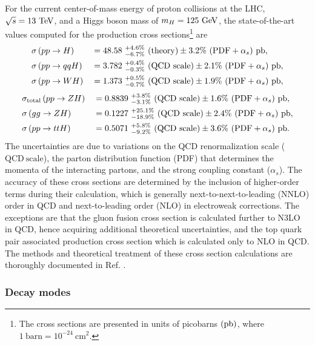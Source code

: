 For the current center-of-mass energy of proton collisions at the LHC, $\sqrt{s} = 13\ \mathrm{TeV}$, and a Higgs boson mass of $m_{H} = 125\ \mathrm{GeV}$, the state-of-the-art values computed for the production cross sections\footnote{The cross sections are presented in units of picobarns $(\mathrm{pb})$, where $1\ \mathrm{barn} = 10^{-24}\ \mathrm{cm}^{2}$.} are
\begin{alignat*}{2}
  &\sigma\left( pp \rightarrow H \right) &&= 48.58\ {}_{-6.7\%}^{+4.6\%} \ (\mathrm{theory}) \pm 3.2\%\ (\mathrm{PDF} + \alpha_{s})\ \mathrm{pb}, \\
  &\sigma\left( pp \rightarrow qqH \right) &&= 3.782\ {}_{-0.3\%}^{+0.4\%} \ (\mathrm{QCD\ scale}) \pm 2.1\%\ (\mathrm{PDF} + \alpha_{s})\ \mathrm{pb}, \\
  &\sigma\left( pp \rightarrow WH \right) &&= 1.373\ {}_{-0.7\%}^{+0.5\%} \ (\mathrm{QCD\ scale}) \pm 1.9\%\ (\mathrm{PDF} + \alpha_{s})\ \mathrm{pb},
\end{alignat*}
\begin{alignat*}{2}
  &\sigma_{\mathrm{total}}\left( pp \rightarrow ZH \right) &&= 0.8839\ {}_{-3.1\%}^{+3.8\%} \ (\mathrm{QCD\ scale}) \pm 1.6\%\ (\mathrm{PDF} + \alpha_{s})\ \mathrm{pb}, \\
  &\sigma\left( gg \rightarrow ZH \right) &&= 0.1227\ {}_{-18.9\%}^{+25.1\%} \ (\mathrm{QCD\ scale}) \pm 2.4\%\ (\mathrm{PDF} + \alpha_{s})\ \mathrm{pb}, \\
  &\sigma\left( pp \rightarrow ttH \right) &&= 0.5071\ {}_{-9.2\%}^{+5.8\%} \ (\mathrm{QCD\ scale}) \pm 3.6\%\ (\mathrm{PDF} + \alpha_{s})\ \mathrm{pb}.
\end{alignat*}
The uncertainties are due to variations on the QCD renormalization scale ($\mathrm{QCD\ scale}$), the parton distribution function (PDF) that determines the momenta of the interacting partons, and the strong coupling constant ($\alpha_{s}$). The accuracy of these cross sections are determined by the inclusion of higher-order terms during their calculation, which is generally next-to-next-to-leading (NNLO) order in QCD and next-to-leading order (NLO) in electroweak corrections. The exceptions are that the gluon fusion cross section is calculated further to N3LO in QCD, hence acquiring additional theoretical uncertainties, and the top quark pair associated production cross section which is calculated only to NLO in QCD. The methods and theoretical treatment of these cross section calculations are thoroughly documented in Ref. \cite{CERNYR4}.

\subsubsection{Decay modes} \label{decaymodes}

